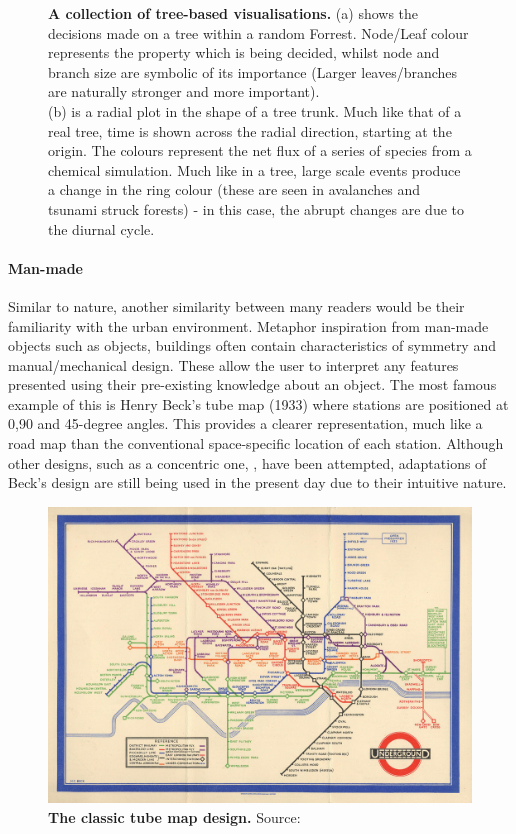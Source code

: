 \begin{figure}[H]
    
        \caption{\textbf{A collection of tree-based visualisations.}
         (a) shows the decisions made on a tree within a random Forrest. Node/Leaf colour represents the property which is being decided, whilst node and branch size are symbolic of its importance (Larger leaves/branches are naturally stronger and more important).\\
          (b) is a radial plot in the shape of a tree trunk. Much like that of a real tree, time is shown across the radial direction, starting at the origin. The colours represent the net flux of a series of species from a chemical simulation. Much like in a tree, large scale events produce a change in the ring colour (these are seen in avalanches and tsunami struck forests) - in this case, the abrupt changes are due to the diurnal cycle.}
        \label{fig:trees}
\end{figure}


\paragraph*{Man-made}
Similar to nature, another similarity between many readers would be their familiarity with the urban environment. Metaphor inspiration from man-made objects such as objects, buildings often contain characteristics of symmetry and manual/mechanical design. These allow the user to interpret any features presented using their pre-existing knowledge about an object. The most famous example of this is Henry Beck's tube map (1933) \cite{beck} where stations are positioned at 0,90 and 45-degree angles. This provides a clearer representation, much like a road map than the conventional space-specific location of each station. Although other designs, such as a concentric one, \cite{circ}, have been attempted, adaptations of Beck's design are still being used in the present day due to their intuitive nature. 
% 
% 
%

\begin{figure}[H]
     \centering

         \includegraphics[width=.495\textwidth]{figures_c1/Beck_Map_1933.jpg}
         \vspace{5mm}
         
         \caption{\textbf{The classic tube map design.} Source: \cite{beck}}
         
         \label{fig:beck}

\end{figure}

